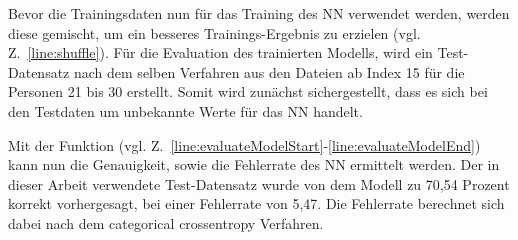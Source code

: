 Bevor die Trainingsdaten nun für das Training des \ac{NN} verwendet werden, werden diese gemischt, um ein besseres Trainings-Ergebnis zu erzielen (vgl. Z.~\ref{line:shuffle}).
\newline
\newline
Für die Evaluation des trainierten Modells, wird ein Test-Datensatz nach dem selben Verfahren aus den Dateien ab Index 15 für die Personen 21 bis 30 erstellt.
Somit wird zunächst sichergestellt, dass es sich bei den Testdaten um unbekannte Werte für das \ac{NN} handelt.

Mit der Funktion  (vgl. Z.~\ref{line:evaluateModelStart}-\ref{line:evaluateModelEnd}) kann nun die Genauigkeit, sowie die Fehlerrate des \ac{NN} ermittelt werden.
Der in dieser Arbeit verwendete Test-Datensatz wurde von dem Modell zu 70,54 Prozent korrekt vorhergesagt, bei einer Fehlerrate von 5,47.
Die Fehlerrate berechnet sich dabei nach dem categorical crossentropy Verfahren.

